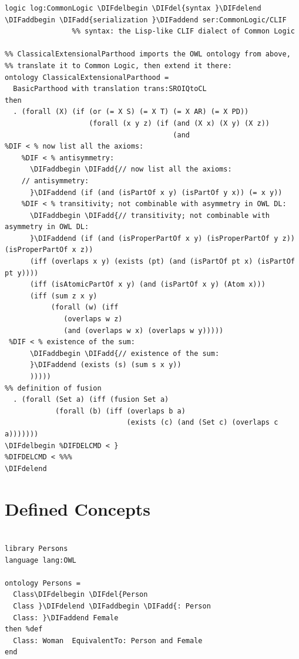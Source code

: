 \documentclass[10pt,fleqn,final]{scrreprt}
\newcommand{\sclause}[1]{\section{#1}}
\providecommand{\DIFadd}[1]{{\protect\color{blue}\uwave{#1}}} %
\providecommand{\DIFdel}[1]{{\protect\color{red}\sout{#1}}}                      %
\providecommand{\DIFaddbegin}{} %
\providecommand{\DIFaddend}{} %
\providecommand{\DIFdelbegin}{} %
\providecommand{\DIFdelend}{} %
\begin{document}
\begin{lstlisting}[basicstyle=\ttfamily,language=dolText,alsolanguage=owl2Manchester,alsolanguage=clif,escapechar=@,mathescape]
logic log:CommonLogic \DIFdelbegin \DIFdel{syntax }\DIFdelend \DIFaddbegin \DIFadd{serialization }\DIFaddend ser:CommonLogic/CLIF
                %% syntax: the Lisp-like CLIF dialect of Common Logic

%% ClassicalExtensionalParthood imports the OWL ontology from above, 
%% translate it to Common Logic, then extend it there:
ontology ClassicalExtensionalParthood =
  BasicParthood with translation trans:SROIQtoCL
then
  . (forall (X) (if (or (= X S) (= X T) (= X AR) (= X PD))
                    (forall (x y z) (if (and (X x) (X y) (X z))
                                        (and                          
%DIF < % now list all the axioms: 
	%DIF < % antisymmetry:
      \DIFaddbegin \DIFadd{// now list all the axioms: 
	// antisymmetry:
      }\DIFaddend (if (and (isPartOf x y) (isPartOf y x)) (= x y)) 
	%DIF < % transitivity; not combinable with asymmetry in OWL DL:
      \DIFaddbegin \DIFadd{// transitivity; not combinable with asymmetry in OWL DL:
      }\DIFaddend (if (and (isProperPartOf x y) (isProperPartOf y z)) (isProperPartOf x z))
      (iff (overlaps x y) (exists (pt) (and (isPartOf pt x) (isPartOf pt y))))
      (iff (isAtomicPartOf x y) (and (isPartOf x y) (Atom x)))
      (iff (sum z x y)
           (forall (w) (iff 
		   	  (overlaps w z) 
			  (and (overlaps w x) (overlaps w y)))))
 %DIF < % existence of the sum:
      \DIFaddbegin \DIFadd{// existence of the sum:
      }\DIFaddend (exists (s) (sum s x y))                                          
      )))))
%% definition of fusion	  
  . (forall (Set a) (iff (fusion Set a)                                  
            (forall (b) (iff (overlaps b a)
                             (exists (c) (and (Set c) (overlaps c a)))))))
\DIFdelbegin %DIFDELCMD < }
%DIFDELCMD < %%%
\DIFdelend \end{lstlisting}

\sclause{Defined Concepts}\DIFdelbegin %
\DIFdelend \DIFaddbegin \label{ex:definedconcepts}
\begin{lstlisting}[basicstyle=\ttfamily,language=dolText,alsolanguage=OWL2manchester,escapechar=@,mathescape]
\DIFaddend %prefix( lang:  <http://purl.net/DOL/languages/> )%

library Persons
language lang:OWL

ontology Persons =
  Class\DIFdelbegin \DIFdel{Person
  Class }\DIFdelend \DIFaddbegin \DIFadd{: Person
  Class: }\DIFaddend Female
then %def
  Class: Woman  EquivalentTo: Person and Female
end
\end{lstlisting}
\end{document}
